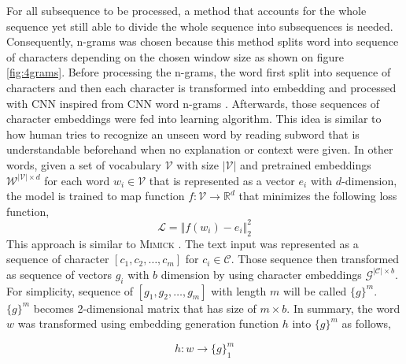         For all subsequence to be processed, a method that accounts
        for the whole sequence yet still able to divide the whole
        sequence into subsequences is needed. Consequently, n-grams
        was chosen because this method splits word into sequence of
        characters depending on the chosen window size as shown on
        figure \ref{fig:4grams}. Before processing the n-grams, the
        word first split into sequence of characters and then each
        character is transformed into embedding and processed with CNN
        inspired from CNN word n-grams \citep{convolutional2014kim}.
        Afterwards, those sequences of character embeddings were fed
        into learning algorithm. This idea is similar to how human
        tries to recognize an unseen word by reading subword that is
        understandable beforehand when no explanation or context were
        given. In other words, given a set of vocabulary $\mathcal{V}$
        with size $\vert\mathcal{V}\vert$ and pretrained embeddings
        $\mathcal{W}^{\vert\mathcal{V}\vert \times d}$ for each word
        $w_{i} \in \mathcal{V}$ that is represented as a vector $e_i$
        with $d$-dimension, the model is trained to map function
        $f:\mathcal{V} \rightarrow \mathbb{R}^d$ that minimizes the
        following loss function,
        \begin{equation}
            \label{eq:lossfn}
            \mathcal{L} = \Vert f(w_i) - e_i \Vert^{2}_2
        \end{equation}
        This approach is similar to \textsc{Mimick}
        \cite{mimicking2017Pinter}. The text input was represented as
        a sequence of character $[c_1, c_2, \dots, c_m]$ for $c_i \in
        \mathcal{C}$. Those sequence then transformed as sequence of
        vectors $g_i$ with $b$ dimension by using character embeddings
        $\mathcal{G}^{\vert \mathcal{C} \vert \times b}$. For
        simplicity, sequence of $[g_1, g_2, \dots, g_m]$ with length
        $m$ will be called $\{g\}^m$. $\{g\}^m$ becomes 2-dimensional
        matrix that has size of $m \times b$. In summary, the word
        $w$ was transformed using embedding generation function $h$
        into $\{g\}^m$ as follows,

        \begin{equation}
            \label{eq:word2charemb}
            h: w \rightarrow \{g\}_1^m
        \end{equation}

